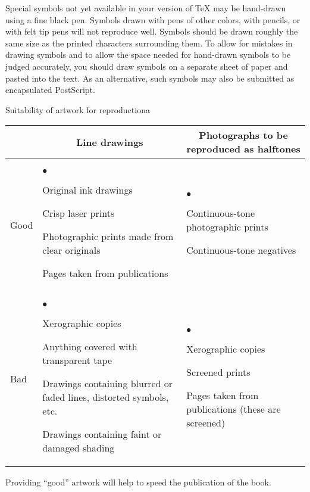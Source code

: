 \documentclass[12pt]{book}
\begin{document}
Special symbols not yet available in your version of {\TeX} may be
hand-drawn using a fine black pen. Symbols drawn with pens of other
colors, with pencils, or with felt tip pens will not reproduce
well. Symbols should be drawn roughly the same size as the printed
characters surrounding them. To allow for mistakes in drawing
symbols and to allow the space needed for hand-drawn symbols to be
judged accurately, you should draw symbols on a separate sheet of
paper and pasted into the text. As an alternative, such symbols may
also be submitted as encapsulated PostScript.

\atable
{Suitability of artwork for reproduction a}
{\begin{tabular}{lp{2.6in}p{2.6in}}\hline
& \multicolumn{1}{c}{Line drawings} &
\multicolumn{1}{c}{Photographs to be reproduced as halftones}\\
\hline
Good &
{\begin{list}{$\bullet$}{\topsep 0in\parsep 0in\itemsep
0in\partopsep 0in}\raggedright
\item Original ink drawings
\item Crisp laser prints
\item Photographic prints made from clear originals
\item Pages taken from publications
\end{list}}
&
{\begin{list}{$\bullet$}{\topsep 0in\parsep 0in\itemsep
0in\partopsep 0in}\raggedright
\item Continuous-tone photographic prints
\item Continuous-tone negatives
\end{list}}
\\
Bad &
{\begin{list}{$\bullet$}{\topsep 0in\parsep 0in\itemsep
0in\partopsep 0in}\raggedright
\item Xerographic copies
\item Anything covered with transparent tape
\item Drawings containing blurred or faded lines, distorted
symbols, etc.
\item Drawings containing faint or damaged shading
\end{list}}
&
{\begin{list}{$\bullet$}{\topsep 0in\parsep 0in\itemsep
0in\partopsep 0in}\raggedright
\item Xerographic copies
\item Screened prints
\item Pages taken from publications (these are screened)
\end{list}}
\\ \hline
\end{tabular}}
{Providing ``good'' artwork will help to speed the
publication of the book.}
\end{document}
